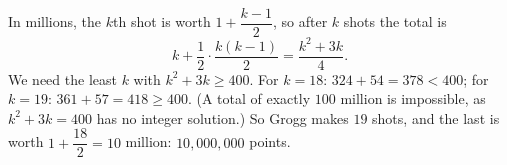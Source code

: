 In millions, the $k$th shot is worth $1+\dfrac{k-1}{2}$, so after $k$ shots the total is
\[k+\dfrac12\cdot\dfrac{k(k-1)}{2}=\dfrac{k^2+3k}{4}.\]
We need the least $k$ with $k^2+3k\ge400$. For $k=18$: $324+54=378<400$; for $k=19$: $361+57=418\ge400$. (A total of exactly $100$ million is impossible, as $k^2+3k=400$ has no integer solution.) So Grogg makes $19$ shots, and the last is worth $1+\dfrac{18}{2}=10$ million: $\boxed{10{,}000{,}000}$ points.
